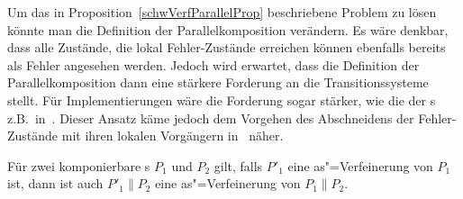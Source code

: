 Um das in Proposition~\ref{schwVerfParallelProp} beschriebene Problem zu lösen
könnte man die Definition der Parallelkomposition verändern. Es wäre denkbar,
dass alle Zustände, die lokal Fehler-Zustände erreichen können ebenfalls
bereits als Fehler angesehen werden. Jedoch wird erwartet, dass die Definition
der Parallelkomposition dann eine stärkere Forderung an die Transitionssysteme
stellt. Für Implementierungen wäre die Forderung sogar stärker, wie die der
\EIO{}s z.B.\ in~\cite{Schinko2016BA}. Dieser Ansatz käme jedoch dem Vorgehen
des Abschneidens der Fehler-Zustände mit ihren lokalen Vorgängern
in~\cite{Vogler2016MIA3} näher.

\begin{Kor}
  \label{verfParallelKor}
  Für zwei komponierbare \MEIO{}s $P_1$ und $P_2$ gilt, falls $P'_1$ eine
  as"=Verfeinerung von $P_1$ ist, dann ist auch $P'_1\|P_2$ eine
  as"=Verfeinerung von $P_1\|P_2$.
\end{Kor}
